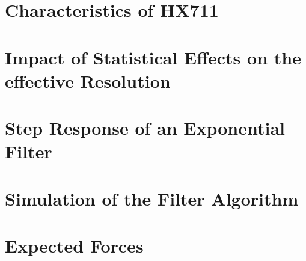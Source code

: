         \section{Characteristics of HX711}\label{sec:A6 characteristics of the HX711}%
        \section{Impact of Statistical Effects on the effective Resolution}\label{sec:A7 statistical effects}%
        \section{Step Response of an Exponential Filter}\label{sec:A8 step response expo filter}%
        \section{Simulation of the Filter Algorithm}\label{sec:A9 simu of the filter algo}%
        \section{Expected Forces}\label{sec:A10 expected forces}%

